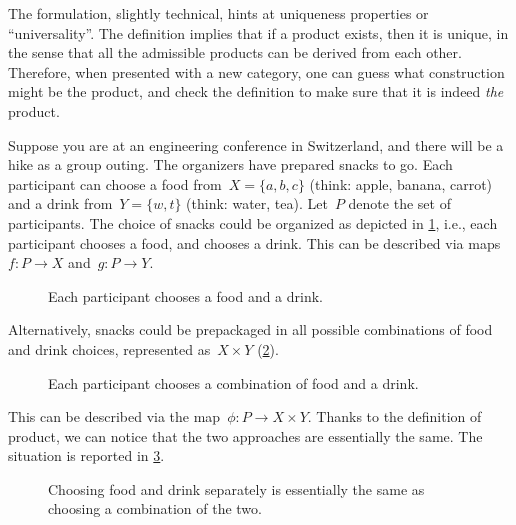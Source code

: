 The formulation, slightly technical, hints at uniqueness properties or ``universality''. The definition implies that if a product exists, then it is unique, in the sense that all the admissible products can be derived from each other. Therefore, when presented with a new category, one can guess what construction might be the product, and check the definition to make sure that it is indeed \emph{the} product.

\begin{example}
Suppose you are at an engineering conference in Switzerland, and there will be a hike as a group outing. The organizers have prepared snacks to go. Each participant can choose a food from~$X=\{a,b,c\}$ (think: apple, banana, carrot) and a drink from~$Y=\{w,t\}$ (think: water, tea). Let~$P$ denote the set of participants. The choice of snacks could be organized as depicted in \cref{fig:snacks_1}, i.e., each participant chooses a food, and chooses a drink. This can be described via maps~$f\colon P\to X$ and~$g\colon P\to Y$.

\begin{figure}[h!]
\begin{center}
\end{center}
\caption{Each participant chooses a food and a drink. \label{fig:snacks_1}}
\end{figure}


Alternatively, snacks could be prepackaged in all possible combinations of food and drink choices, represented as~$X\times Y$ (\cref{fig:snacks_2}).

\begin{figure}[h!]
\begin{center}
\end{center}
\caption{Each participant chooses a combination of food and a drink. \label{fig:snacks_2}}
\end{figure}

This can be described via the map~$\phi\colon P\to X\times Y$. Thanks to the definition of product, we can notice that the two approaches are essentially the same. The situation is reported in \cref{fig:snacks_3}.

\begin{figure}[h!]
\begin{center}
\end{center}
\caption{Choosing food and drink separately is essentially the same as choosing a combination of the two. \label{fig:snacks_3}}
\end{figure}


\end{example}
